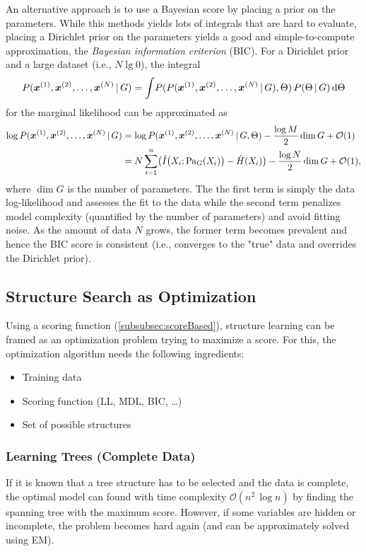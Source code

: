 				An alternative approach is to use a Bayesian score by placing a prior on the parameters. While this methods yields lots of integrals that are hard to evaluate, placing a Dirichlet prior on the parameters yields a good and simple-to-compute approximation, the \emph{Bayesian information criterion} (BIC). For a Dirichlet prior and a large dataset (i.e., \( N \lg 0 \)), the integral
				\begin{equation}
					P(\bm{x}^{(1)}, \bm{x}^{(2)}, \dots, \bm{x}^{(N)} \,\vert\, G) = \int\! P(P(\bm{x}^{(1)}, \bm{x}^{(2)}, \dots, \bm{x}^{(N)} \,\vert\, G), \Theta) \, P(\Theta \,\vert\, G) \dd{\Theta}
				\end{equation}
				for the marginal likelihood can be approximated as
				\begin{align}
					\log P(\bm{x}^{(1)}, \bm{x}^{(2)}, \dots, \bm{x}^{(N)} \,\vert\, G)
					 & = \log P(\bm{x}^{(1)}, \bm{x}^{(2)}, \dots, \bm{x}^{(N)} \,\vert\, G, \Theta) - \frac{\log M}{2} \dim G + \mathcal{O}(1)           \\
					 & = N \sum_{i = 1}^{n} \bigl( \hat{I}\bigl( X_i; \operatorname{Pa}_G(X_i) \bigr) - \hat{H}(X_i) \bigr) - \frac{\log N}{2} \dim G + \mathcal{O}(1),
				\end{align}
				where \( \dim G \) is the number of parameters. The the first term is simply the data log-likelihood and assesses the fit to the data while the second term penalizes model complexity (quantified by the number of parameters) and avoid fitting noise. As the amount of data \(N\) grows, the former term becomes prevalent and hence the BIC score is consistent (i.e., converges to the "true" data and overrides the Dirichlet prior).

		\subsection{Structure Search as Optimization}
			Using a scoring function (\autoref{subsubsec:scoreBased}), structure learning can be framed as an optimization problem trying to maximize a score. For this, the optimization algorithm needs the following ingredients:
			\begin{itemize}
				\item Training data
				\item Scoring function (LL, MDL, BIC, \dots)
				\item Set of possible structures
			\end{itemize}

			\subsubsection{Learning Trees (Complete Data)}
				If it is known that a tree structure has to be selected and the data is complete, the optimal model can found with time complexity \( \mathcal{O}(n^2 \, \log n) \) by finding the spanning tree with the maximum score. However, if some variables are hidden or incomplete, the problem becomes hard again (and can be approximately solved using EM).

